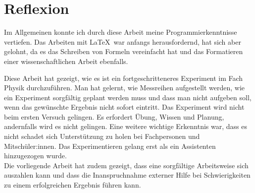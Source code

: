 \chapter{Reflexion}\label{cha:reflexion}
Im Allgemeinen konnte ich durch diese Arbeit meine Programmierkenntnisse vertiefen. Das Arbeiten mit \LaTeX~war anfangs herausfordernd, hat sich aber gelohnt, da es das Schreiben von Formeln vereinfacht hat und das Formatieren einer wissenschaftlichen Arbeit ebenfalls. 

Diese Arbeit hat gezeigt, wie es ist ein fortgeschritteneres Experiment im Fach Physik durchzuführen. Man hat gelernt, wie Messreihen aufgestellt werden, wie ein Experiment sorgfältig geplant werden muss und dass man nicht aufgeben soll, wenn das gewünschte Ergebnis nicht sofort eintritt. Das Experiment wird nicht beim ersten Versuch gelingen. Es erfordert Übung, Wissen und Planung, andernfalls wird es nicht gelingen. Eine weitere wichtige Erkenntnis war, dass es nicht schadet sich Unterstützung zu holen bei Fachpersonen und Mitschüler:innen. Das Experimentieren gelang erst als ein Assistenten hinzugezogen wurde. \\

\noindent Die vorliegende Arbeit hat zudem gezeigt, dass eine sorgfältige Arbeitsweise sich auszahlen kann und dass die Inanspruchnahme externer Hilfe bei Schwierigkeiten zu einem erfolgreichen Ergebnis führen kann.


